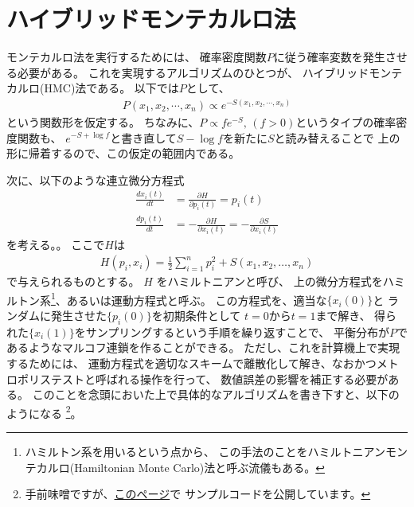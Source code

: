 \documentclass[]{ltjsarticle}
\begin{document}
\section{ハイブリッドモンテカルロ法}
モンテカルロ法を実行するためには、
確率密度関数$P$に従う確率変数を発生させる必要がある。
これを実現するアルゴリズムのひとつが、
ハイブリッドモンテカルロ(HMC)法である。
以下では$P$として、
\begin{align}
    P(x_1,x_2,\cdots,x_n) \propto e^{-S(x_1,x_2,\cdots,x_n)}
\end{align}
という関数形を仮定する。
ちなみに、$P \propto fe^{-S}, \, (f>0)$というタイプの確率密度関数も、
$e^{-S+\log f}$と書き直して$S-\log f$を新たに$S$と読み替えることで
上の形に帰着するので、この仮定の範囲内である。

次に、以下のような連立微分方程式
\begin{align}
    \frac{dx_i(t)}{dt} &= \frac{\partial H}{\partial p_i(t)} = p_i(t) \\
    \frac{dp_i(t)}{dt} &= -\frac{\partial H}{\partial x_i(t)} = -\frac{\partial S}{\partial x_i(t)}
\end{align}
を考える。。
ここで$H$は
\begin{align}
    H(p_i,x_i) = \frac{1}{2}\sum_{i=1}^n p^2_i + S(x_1,x_2,\dots,x_n)
\end{align}
で与えられるものとする。
$H$ をハミルトニアンと呼び、
上の微分方程式をハミルトン系\footnote{
    ハミルトン系を用いるという点から、
    この手法のことをハミルトニアンモンテカルロ(Hamiltonian Monte Carlo)法と呼ぶ流儀もある。    
}、あるいは運動方程式と呼ぶ。
この方程式を、適当な$\{x_i(0)\}$と
ランダムに発生させた$\{p_i(0)\}$を初期条件として
$t=0$から$t=1$まで解き、
得られた$\{x_i(1)\}$をサンプリングするという手順を繰り返すことで、
平衡分布が$P$であるようなマルコフ連鎖を作ることができる。
ただし、これを計算機上で実現するためには、
運動方程式を適切なスキームで離散化して解き、なおかつメトロポリステストと呼ばれる操作を行って、
数値誤差の影響を補正する必要がある。
このことを念頭においた上で具体的なアルゴリズムを書き下すと、以下のようになる
\footnote{
    手前味噌ですが、\href{https://qiita.com/Shoichiro-Tsutsui/items/8ac73c301ddfd1522e4b}{このページ}で
    サンプルコードを公開しています。
}。
\end{document}
